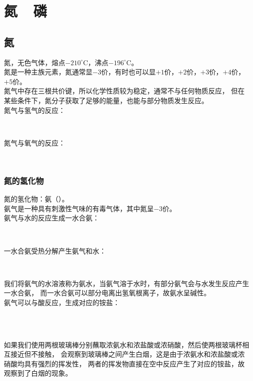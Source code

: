 \documentclass[UTF8]{ctexart}
\begin{document}
\newpage

\section{氮~~磷}

\subsection{氮}
    氮，无色气体，熔点$-210^\circ$C，沸点$-196^\circ$C。\\[3mm]
    氮是一种主族元素，氮通常显$-3$价，有时也可以显$+1$价，$+2$价，$+3$价，$+4$价，$+5$价。\\[5mm]
    氮气中存在三根共价键，所以化学性质较为稳定，通常不与任何物质反应，
    但在某些条件下，氮分子获取了足够的能量，也能与部分物质发生反应。\\[3mm]
    氮气与氢气的反应：
    \begin{center}
        \\[4mm]
    \end{center}
    氮气与氧气的反应：
    \begin{center}
        \\[4mm]
    \end{center}

\subsubsection{氮的氢化物}
    氮的氢化物：氨（）。\\[3mm]
    氨气是一种具有刺激性气味的有毒气体，其中氮呈$-3$价。\\[5mm]
    氨气与水的反应生成一水合氨：
    \begin{center}
        \\[4mm]
    \end{center}
    一水合氨受热分解产生氨气和水：
    \begin{center}
        \\[4mm]
    \end{center}
    我们将氨气的水溶液称为氨水，当氨气溶于水时，有部分氨气会与水发生反应产生一水合氨，
    而一水合氨可以部分电离出氢氧根离子，故氨水呈碱性。\\[5mm]
    氨气可以与酸反应，生成对应的铵盐：
    \begin{center}
        \\[3mm]
        \\[3mm]
    \end{center}
    如果我们使用两根玻璃棒分别蘸取浓氨水和浓盐酸或浓硝酸，然后使两根玻璃杯相互接近但不接触，
    会观察到玻璃棒之间产生白烟，这是由于浓氨水和浓盐酸或浓硝酸均具有强烈的挥发性，
    两者的挥发物直接在空中反应产生了对应的铵盐，故观察到了白烟的现象。
    
\end{document}
